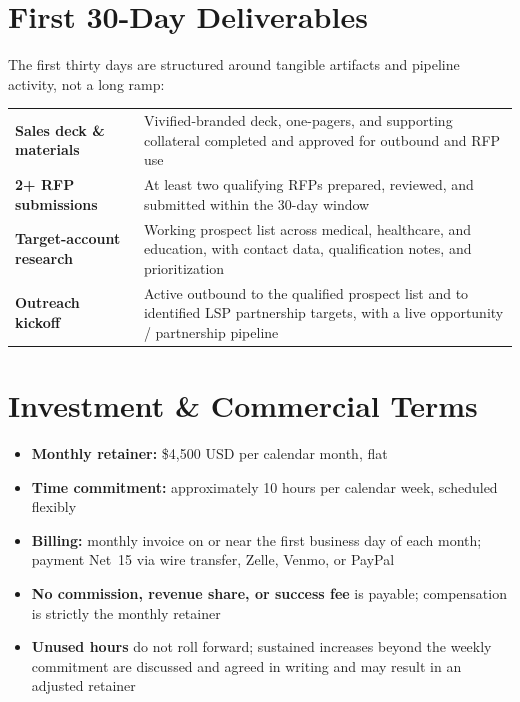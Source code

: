 \documentclass{toospoint}
\begin{document}
\section{First 30-Day Deliverables}

The first thirty days are structured around tangible artifacts and pipeline
activity, not a long ramp:

\vspace{4pt}
\begin{mdframed}[
  linecolor=TPTeal,
  linewidth=1.2pt,
  roundcorner=4pt,
  backgroundcolor=TPLight,
  innerleftmargin=14pt,
  innerrightmargin=14pt,
  innertopmargin=10pt,
  innerbottommargin=10pt
]
\sffamily\small
\begin{tabular}{@{}p{}p{}@{}}
  \textbf{Sales deck \& materials}    & Vivified-branded deck, one-pagers, and supporting collateral completed and approved for outbound and RFP use \\[6pt]
  \textbf{2+ RFP submissions}         & At least two qualifying RFPs prepared, reviewed, and submitted within the 30-day window \\[6pt]
  \textbf{Target-account research}    & Working prospect list across medical, healthcare, and education, with contact data, qualification notes, and prioritization \\[6pt]
  \textbf{Outreach kickoff}           & Active outbound to the qualified prospect list and to identified LSP partnership targets, with a live opportunity / partnership pipeline \\
\end{tabular}
\end{mdframed}

\section{Investment \& Commercial Terms}

\begin{itemize}[leftmargin=1.5em, itemsep=4pt, topsep=4pt]
  \item \textbf{Monthly retainer:} \$4{,}500 USD per calendar month, flat
  \item \textbf{Time commitment:} approximately 10 hours per calendar week, scheduled flexibly
  \item \textbf{Billing:} monthly invoice on or near the first business day of each month; payment Net~15 via wire transfer, Zelle, Venmo, or PayPal
  \item \textbf{No commission, revenue share, or success fee} is payable; compensation is strictly the monthly retainer
  \item \textbf{Unused hours} do not roll forward; sustained increases beyond the weekly commitment are discussed and agreed in writing and may result in an adjusted retainer
\end{itemize}
\end{document}
